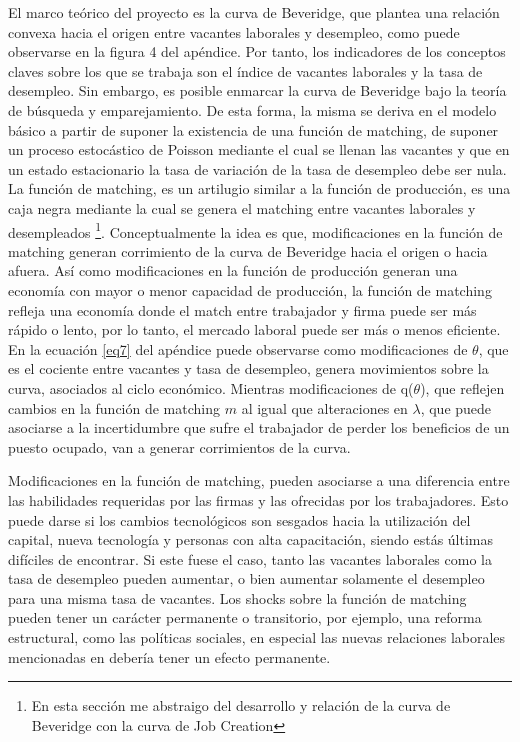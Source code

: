 El marco teórico del proyecto es la curva de Beveridge, que plantea una relación convexa hacia el origen entre vacantes laborales y desempleo, como puede observarse en la figura 4 del apéndice. Por tanto, los indicadores de los conceptos claves sobre los que se trabaja son el índice de vacantes laborales y la tasa de desempleo. Sin embargo, es posible enmarcar la curva de Beveridge bajo la teoría de búsqueda y emparejamiento. De esta forma, la misma se deriva en el modelo básico \cite{Pissarides2000} a partir de suponer la existencia de una función de matching, de suponer un proceso estocástico de Poisson mediante el cual se llenan las vacantes y que en un estado estacionario la tasa de variación de la tasa de desempleo debe ser nula. La función de matching, es un artilugio similar a la función de producción, es una caja negra mediante la cual se genera el matching entre vacantes laborales y desempleados \cite{Pissarides2000}\footnote{En esta sección me abstraigo del desarrollo y relación de la curva de Beveridge con la curva de Job Creation}. Conceptualmente la idea es que, modificaciones en la función de matching generan corrimiento de la curva de Beveridge hacia el origen o hacia afuera. Así como modificaciones en la función de producción generan una economía con mayor o menor capacidad de producción, la función de matching refleja una economía donde el match entre trabajador y firma puede ser más rápido o lento, por lo tanto, el mercado laboral puede ser más o menos eficiente. En la ecuación \eqref{eq7} del apéndice puede observarse como modificaciones de $\theta$, que es el cociente entre vacantes y tasa de desempleo, genera movimientos sobre la curva, asociados al ciclo económico. Mientras modificaciones de q($\theta$), que reflejen cambios en la función de matching $m$ al igual que alteraciones en $\lambda$, que puede asociarse a la incertidumbre que sufre el trabajador de perder los beneficios de un puesto ocupado, van a generar corrimientos de la curva.

Modificaciones en la función de matching, pueden asociarse a una diferencia entre las habilidades requeridas por las firmas y las ofrecidas por los trabajadores. Esto puede darse si los cambios tecnológicos son sesgados hacia la utilización del capital, nueva tecnología y personas con alta capacitación, siendo estás últimas difíciles de encontrar. Si este fuese el caso, tanto las vacantes laborales como la tasa de desempleo pueden aumentar, o bien aumentar solamente el desempleo para una misma tasa de vacantes. Los shocks sobre la función de matching pueden tener un carácter permanente o transitorio, por ejemplo, una reforma estructural, como las políticas sociales, en especial las nuevas relaciones laborales mencionadas en \cite{Bergara2017} debería tener un efecto permanente.

